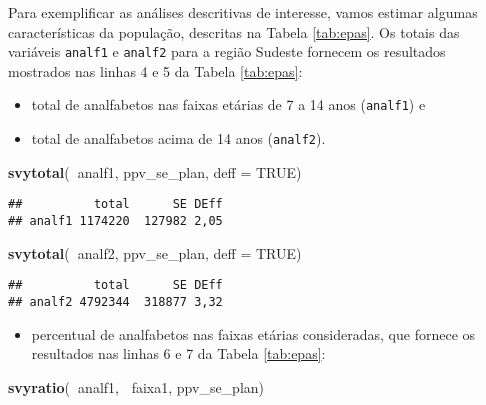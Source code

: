 \documentclass[]{book}
\newenvironment{Shaded}{\begin{snugshade}}{\end{snugshade}}
\newcommand{\KeywordTok}[1]{\textcolor[rgb]{0.13,0.29,0.53}{\textbf{#1}}}
\newcommand{\DataTypeTok}[1]{\textcolor[rgb]{0.13,0.29,0.53}{#1}}
\newcommand{\OtherTok}[1]{\textcolor[rgb]{0.56,0.35,0.01}{#1}}
\newcommand{\OperatorTok}[1]{\textcolor[rgb]{0.81,0.36,0.00}{\textbf{#1}}}
\newcommand{\NormalTok}[1]{#1}
\providecommand{\tightlist}{%
  \setlength{\itemsep}{0pt}\setlength{\parskip}{0pt}}
\theoremstyle{definition}
\theoremstyle{definition}
\theoremstyle{definition}
\theoremstyle{remark}
\begin{document}
Para exemplificar as análises descritivas de interesse, vamos estimar
algumas características da população, descritas na Tabela
\ref{tab:epas}. Os totais das variáveis \texttt{analf1} e
\texttt{analf2} para a região Sudeste fornecem os resultados mostrados
nas linhas 4 e 5 da Tabela \ref{tab:epas}:

\begin{itemize}
\tightlist
\item
  total de analfabetos nas faixas etárias de 7 a 14 anos
  (\texttt{analf1}) e
\item
  total de analfabetos acima de 14 anos (\texttt{analf2}).
\end{itemize}

\begin{Shaded}
\begin{Highlighting}[]
\KeywordTok{svytotal}\NormalTok{(}\OperatorTok{~}\NormalTok{analf1, ppv_se_plan, }\DataTypeTok{deff =} \OtherTok{TRUE}\NormalTok{)}
\end{Highlighting}
\end{Shaded}

\begin{verbatim}
##          total      SE DEff
## analf1 1174220  127982 2,05
\end{verbatim}

\begin{Shaded}
\begin{Highlighting}[]
\KeywordTok{svytotal}\NormalTok{(}\OperatorTok{~}\NormalTok{analf2, ppv_se_plan, }\DataTypeTok{deff =} \OtherTok{TRUE}\NormalTok{)}
\end{Highlighting}
\end{Shaded}

\begin{verbatim}
##          total      SE DEff
## analf2 4792344  318877 3,32
\end{verbatim}

\begin{itemize}
\tightlist
\item
  percentual de analfabetos nas faixas etárias consideradas, que fornece
  os resultados nas linhas 6 e 7 da Tabela \ref{tab:epas}:
\end{itemize}

\begin{Shaded}
\begin{Highlighting}[]
\KeywordTok{svyratio}\NormalTok{(}\OperatorTok{~}\NormalTok{analf1, }\OperatorTok{~}\NormalTok{faixa1, ppv_se_plan)}
\end{Highlighting}
\end{Shaded}
\end{document}
